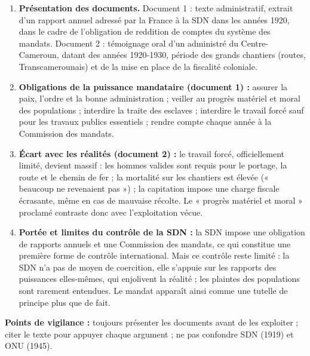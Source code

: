 \documentclass[11pt]{article}
\begin{document}
\begin{corrige}
\begin{enumerate}
\item \textbf{Présentation des documents.} Document 1 : texte administratif, extrait d'un rapport annuel adressé par la France à la SDN dans les années 1920, dans le cadre de l'obligation de reddition de comptes du système des mandats. Document 2 : témoignage oral d'un administré du Centre-Cameroun, datant des années 1920-1930, période des grands chantiers (routes, Transcamerounais) et de la mise en place de la fiscalité coloniale.
\item \textbf{Obligations de la puissance mandataire (document 1) :} assurer la paix, l'ordre et la bonne administration ; veiller au progrès matériel et moral des populations ; interdire la traite des esclaves ; interdire le travail forcé sauf pour les travaux publics essentiels ; rendre compte chaque année à la Commission des mandats.
\item \textbf{Écart avec les réalités (document 2) :} le travail forcé, officiellement limité, devient massif : les hommes valides sont requis pour le portage, la route et le chemin de fer ; la mortalité sur les chantiers est élevée (« beaucoup ne revenaient pas ») ; la capitation impose une charge fiscale écrasante, même en cas de mauvaise récolte. Le « progrès matériel et moral » proclamé contraste donc avec l'exploitation vécue.
\item \textbf{Portée et limites du contrôle de la SDN :} la SDN impose une obligation de rapports annuels et une Commission des mandats, ce qui constitue une première forme de contrôle international. Mais ce contrôle reste limité : la SDN n'a pas de moyen de coercition, elle s'appuie sur les rapports des puissances elles-mêmes, qui enjolivent la réalité ; les plaintes des populations sont rarement entendues. Le mandat apparaît ainsi comme une tutelle de principe plus que de fait.
\end{enumerate}
\textbf{Points de vigilance :} toujours présenter les documents avant de les exploiter ; citer le texte pour appuyer chaque argument ; ne pas confondre SDN (1919) et ONU (1945).
\end{corrige}
\end{document}
